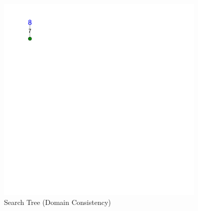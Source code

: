 \begin{frame}
{\vfill
{}
}
\end{frame}

\begin{figure}[ht]
\caption{\label{sudoku:searchtreedc}Search Tree (Domain Consistency)}
\begin{center}
\includegraphics[width=10cm]{../sudoku/DC/tree_expanded_2}
\end{center}
\end{figure}

